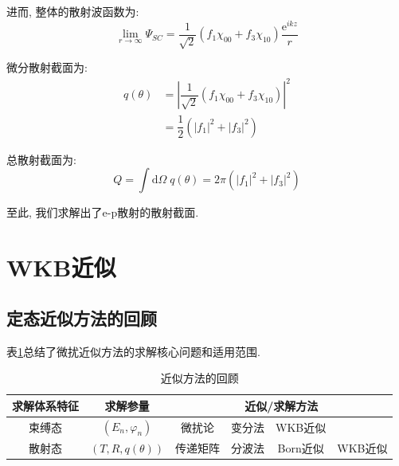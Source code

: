 \documentclass[a4paper, 11pt]{article}
\begin{document}
\begin{spacing}{1.2}
          进而, 整体的散射波函数为:
          \begin{equation}
            \lim_{r\to\infty}\Psi_{SC} = \dfrac{1}{\sqrt{2}}\left(f_1\chi_{00}+f_3\chi_{10}\right)%
                                                            \dfrac{\mathrm{e}^{ikz}}{r}
          \end{equation}

          微分散射截面为:
          \begin{equation}
            \begin{aligned}
              q(\theta) &= \left|\dfrac{1}{\sqrt{2}}\left(f_1\chi_{00}+f_3\chi_{10}\right)\right|^2\\
                        &= \dfrac{1}{2}\left(|f_1|^2+|f_3|^2\right)
            \end{aligned}
          \end{equation}

          总散射截面为:
          \begin{equation}
            Q = \int\mathrm{d}\Omega\;q(\theta) = 2\pi\left(|f_1|^2+|f_3|^2\right)
          \end{equation}

          至此, 我们求解出了e-p散射的散射截面. 

    \section{WKB近似}
      \subsection{定态近似方法的回顾}

      表\ref{weiraohuigu}总结了微扰近似方法的求解核心问题和适用范围.

      \begin{table}[H]
        \centering
        \caption{近似方法的回顾}
        \begin{spacing}{1.4}
        \label{weiraohuigu}
        \begin{tabular}{c|c|cccc}
          \toprule
          求解体系特征  &  求解参量 & \multicolumn{4}{c}{近似/求解方法}\\
          \hline
          束缚态 & $\left(E_n, \varphi_n\right)$&微扰论 & 变分法 & WKB近似 &\\
          \hline
          散射态 & $\left(T, R, q(\theta)\right)$ & 传递矩阵 & 分波法 & Born近似 & WKB近似\\
          \bottomrule 
        \end{tabular} 
        \end{spacing}
      \end{table}


\end{spacing}
\end{document}
